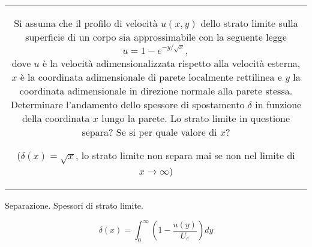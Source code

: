 \noindent
\begin{tabular}{c}
\begin{minipage}[b]{0.95\textwidth}
\begin{exerciseS}
Si assuma che il profilo di velocit\`{a} $u(x,y)$ dello strato limite sulla superficie di un corpo
sia approssimabile con la seguente legge
$$
 u = 1-e^{-y/\sqrt{x}},
$$
dove $u$ \`{e} la velocit\`{a} adimensionalizzata rispetto alla velocit\`{a} esterna, $x$ \`{e} la 
coordinata adimensionale di parete localmente rettilinea e $y$ la coordinata adimensionale in direzione
normale alla parete stessa. Determinare l'andamento dello spessore di spostamento $\delta$ in funzione 
della coordinata $x$ lungo la parete. Lo strato limite in questione separa? Se si per quale valore di $x$?
\vspace{0.5cm}

($\delta(x)=\sqrt{x}$, lo strato limite non separa mai se non nel limite di $x\rightarrow\infty$)
\end{exerciseS}
\end{minipage}
\end{tabular}



\sol

\partone
 Separazione. Spessori di strato limite.

\begin{equation}
  \delta(x) = \int_{0}^{\infty} \left( 1 - \frac{u(y)}{U_e} \right) dy
\end{equation}

\parttwo

